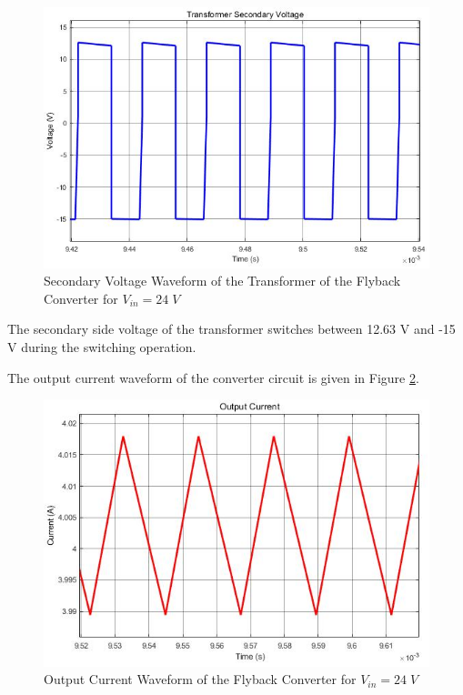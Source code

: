 \begin{figure}[H]
\begin{center}
\includegraphics[width=1\textwidth]{secondary_voltage_24.jpg}
\caption{Secondary Voltage Waveform of the Transformer of the Flyback Converter for $ V_{in} = 24\;V $}
\label{fig:sec24}
\end{center}
\end{figure}

The secondary side voltage of the transformer switches between 12.63 V and -15 V during the switching operation.

The output current waveform of the converter circuit is given in Figure \ref{fig:outcurr24}.

\begin{figure}[H]
\begin{center}
\includegraphics[width=1\textwidth]{output_current_24.jpg}
\caption{Output Current Waveform of the Flyback Converter for $ V_{in} = 24\;V $}
\label{fig:outcurr24}
\end{center}
\end{figure}

